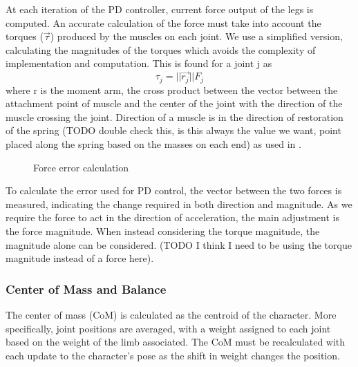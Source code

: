 At each iteration of the PD controller, current force output of the legs is computed.  An accurate calculation of the force must take into account the torques ($\vec{\tau}$) produced by the muscles on each joint.  We use a simplified version, calculating the magnitudes of the torques which avoids the complexity of implementation and computation.  This is found for a joint j as \[\tau_j = ||\vec{r_j}|| F_j\] where r is the moment arm, the cross product between the vector between the attachment point of muscle and the center of the joint with the direction of the muscle crossing the joint.  Direction of a muscle is in the direction of restoration of the spring (TODO double check this, is this always the value we want, point placed along the spring based on the masses on each end) as used in \cite{muscle_based_bipeds}.

\begin{figure}[ht]
	\centering
	\caption[Algorithm diagram for calculation of force error]{Force error calculation}
	\label{fig:forceErr}
\end{figure}

To calculate the error used for PD control, the vector between the two forces is measured, indicating the change required in both direction and magnitude.  As we require the force to act in the direction of acceleration, the main adjustment is the force magnitude.  When instead considering the torque magnitude, the magnitude alone can be considered. (TODO I think I need to be using the torque magnitude instead of a force here).

\subsubsection{Center of Mass and Balance}
The center of mass (CoM) is calculated as the centroid of the character.  More specifically, joint positions are averaged, with a weight assigned to each joint based on the weight of the limb associated.  The CoM must be recalculated with each update to the character's pose as the shift in weight changes the position.

